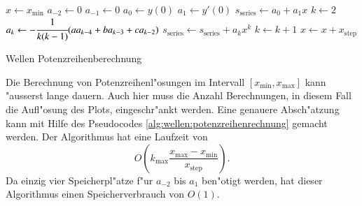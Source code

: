 \begin{algorithm}
	\begin{algorithmic}[1]
		\State $x \gets x_{\text{min}}$
			\State $a_{-2} \gets 0$
			\State $a_{-1} \gets 0$
			\State $a_0 \gets y(0)$
			\State $a_1 \gets y'(0)$
			\State $s_{\text{series}} \gets a_0 + a_1x$
			\State $k \gets 2$
				\State $a_k \gets -\cfrac{1}{k(k-1)}			
				(aa_{k-4}+ba_{k-3}+ca_{k-2})$
				\State $s_{\text{series}} \gets s_{\text{series}} + a_k x^k$
				\State $k \gets k + 1$
			\EndFor
			\State $x \gets x + x_{\text{step}}$
		\EndFor
	\end{algorithmic}
	\caption{Wellen Potenzreihenberechnung} 
	\label{alg:wellen:potenzreihenrechnung}
\end{algorithm}

Die Berechnung von Potenzreihenl"osungen im Intervall
$[x_{\text{min}},x_{\text{max}}]$ kann "ausserst lange dauern. Auch hier muss 
die Anzahl Berechnungen, in diesem Fall die Aufl"osung des Plots, 
eingeschr"ankt werden. Eine genauere Absch"atzung kann mit Hilfe des 
Pseudocodes \ref{alg:wellen:potenzreihenrechnung} gemacht werden. Der 
Algorithmus hat eine Laufzeit von
\begin{equation*}
	O
	\left(
		k_{\text{max}}\frac{x_{\text{max}}-x_{\text{min}}}{x_{\text{step}}}
	\right).
\end{equation*}
Da einzig vier Speicherpl"atze f"ur $a_{-2}$ bis $a_1$ ben"otigt werden, hat 
dieser Algorithmus einen Speicherverbrauch von $O(1)$.
%

